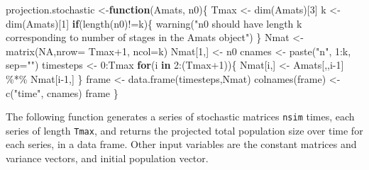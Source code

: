 \documentclass[
]{book}
\newenvironment{Shaded}{\begin{snugshade}}{\end{snugshade}}
\newcommand{\AttributeTok}[1]{\textcolor[rgb]{0.77,0.63,0.00}{#1}}
\newcommand{\ConstantTok}[1]{\textcolor[rgb]{0.00,0.00,0.00}{#1}}
\newcommand{\ControlFlowTok}[1]{\textcolor[rgb]{0.13,0.29,0.53}{\textbf{#1}}}
\newcommand{\DecValTok}[1]{\textcolor[rgb]{0.00,0.00,0.81}{#1}}
\newcommand{\FunctionTok}[1]{\textcolor[rgb]{0.00,0.00,0.00}{#1}}
\newcommand{\NormalTok}[1]{#1}
\newcommand{\OtherTok}[1]{\textcolor[rgb]{0.56,0.35,0.01}{#1}}
\newcommand{\SpecialCharTok}[1]{\textcolor[rgb]{0.00,0.00,0.00}{#1}}
\newcommand{\StringTok}[1]{\textcolor[rgb]{0.31,0.60,0.02}{#1}}
\begin{document}
\begin{Shaded}
\begin{Highlighting}[]
\NormalTok{projection.stochastic }\OtherTok{\textless{}{-}}\ControlFlowTok{function}\NormalTok{(Amats, n0)\{}
\NormalTok{    Tmax }\OtherTok{\textless{}{-}} \FunctionTok{dim}\NormalTok{(Amats)[}\DecValTok{3}\NormalTok{]}
\NormalTok{    k }\OtherTok{\textless{}{-}} \FunctionTok{dim}\NormalTok{(Amats)[}\DecValTok{1}\NormalTok{]}
    \ControlFlowTok{if}\NormalTok{(}\FunctionTok{length}\NormalTok{(n0)}\SpecialCharTok{!=}\NormalTok{k)\{}
      \FunctionTok{warning}\NormalTok{(}\StringTok{"n0 should have length k corresponding to number of stages in the Amats object"}\NormalTok{)}
\NormalTok{      \}}
\NormalTok{    Nmat }\OtherTok{\textless{}{-}} \FunctionTok{matrix}\NormalTok{(}\ConstantTok{NA}\NormalTok{,}\AttributeTok{nrow=}\NormalTok{ Tmax}\SpecialCharTok{+}\DecValTok{1}\NormalTok{, }\AttributeTok{ncol=}\NormalTok{k)}
\NormalTok{    Nmat[}\DecValTok{1}\NormalTok{,] }\OtherTok{\textless{}{-}}\NormalTok{ n0}
\NormalTok{  cnames }\OtherTok{\textless{}{-}} \FunctionTok{paste}\NormalTok{(}\StringTok{"n"}\NormalTok{, }\DecValTok{1}\SpecialCharTok{:}\NormalTok{k, }\AttributeTok{sep=}\StringTok{""}\NormalTok{)}
\NormalTok{  timesteps }\OtherTok{\textless{}{-}} \DecValTok{0}\SpecialCharTok{:}\NormalTok{Tmax}
    \ControlFlowTok{for}\NormalTok{(i }\ControlFlowTok{in} \DecValTok{2}\SpecialCharTok{:}\NormalTok{(Tmax}\SpecialCharTok{+}\DecValTok{1}\NormalTok{))\{  }
\NormalTok{        Nmat[i,] }\OtherTok{\textless{}{-}}\NormalTok{ Amats[,,i}\DecValTok{{-}1}\NormalTok{] }\SpecialCharTok{\%*\%}\NormalTok{ Nmat[i}\DecValTok{{-}1}\NormalTok{,]}
\NormalTok{        \}}
\NormalTok{  frame }\OtherTok{\textless{}{-}} \FunctionTok{data.frame}\NormalTok{(timesteps,Nmat)}
  \FunctionTok{colnames}\NormalTok{(frame) }\OtherTok{\textless{}{-}} \FunctionTok{c}\NormalTok{(}\StringTok{"time"}\NormalTok{, cnames)}
\NormalTok{  frame}
\NormalTok{\}}
\end{Highlighting}
\end{Shaded}

The following function generates a series of stochastic matrices \texttt{nsim} times, each series of length \texttt{Tmax}, and returns the projected total population size over time for each series, in a data frame. Other input variables are the constant matrices and variance vectors, and initial population vector.
\end{document}
